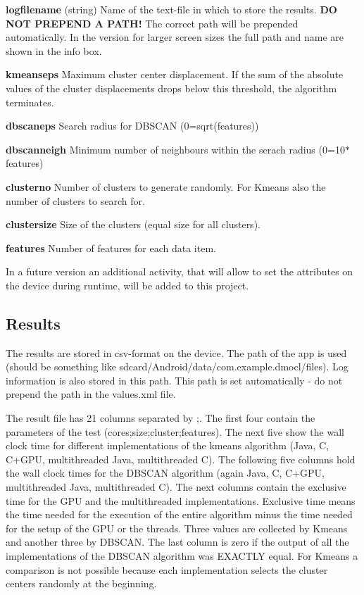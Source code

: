 \begin{DoxyItemize}
\item {\bfseries logfilename} (string) Name of the text-\/file in which to store the results. {\bfseries DO N\+OT P\+R\+E\+P\+E\+ND A P\+A\+T\+H!} The correct path will be prepended automatically. In the version for larger screen sizes the full path and name are shown in the info box.
\item {\bfseries kmeanseps} Maximum cluster center displacement. If the sum of the absolute values of the cluster displacements drops below this threshold, the algorithm terminates.
\item {\bfseries dbscaneps} Search radius for D\+B\+S\+C\+AN (0=sqrt(features))
\item {\bfseries dbscanneigh} Minimum number of neighbours within the serach radius (0=10$\ast$features)
\item {\bfseries clusterno} Number of clusters to generate randomly. For Kmeans also the number of clusters to search for.
\item {\bfseries clustersize} Size of the clusters (equal size for all clusters).
\item {\bfseries features} Number of features for each data item.
\end{DoxyItemize}

In a future version an additional activity, that will allow to set the attributes on the device during runtime, will be added to this project. ~\newline
 \subsection*{Results}

The results are stored in csv-\/format on the device. The path of the app is used (should be something like sdcard/\+Android/data/com.\+example.\+dmocl/files). Log information is also stored in this path. This path is set automatically -\/ do not prepend the path in the values.\+xml file.

The result file has 21 columns separated by \textquotesingle{};\textquotesingle{}. The first four contain the parameters of the test (cores;size;cluster;features). The next five show the wall clock time for different implementations of the kmeans algorithm (Java, C, C+\+G\+PU, multithreaded Java, multithreaded C). The following five columns hold the wall clock times for the D\+B\+S\+C\+AN algorithm (again Java, C, C+\+G\+PU, multithreaded Java, multithreaded C). The next columns contain the exclusive time for the G\+PU and the multithreaded implementations. \textquotesingle{}Exclusive time\textquotesingle{} means the time needed for the execution of the entire algorithm minus the time needed for the setup of the G\+PU or the threads. Three values are collected by Kmeans and another three by D\+B\+S\+C\+AN. The last column is zero if the output of all the implementations of the D\+B\+S\+C\+AN algorithm was E\+X\+A\+C\+T\+LY equal. For Kmeans a comparison is not possible because each implementation selects the cluster centers randomly at the beginning. 